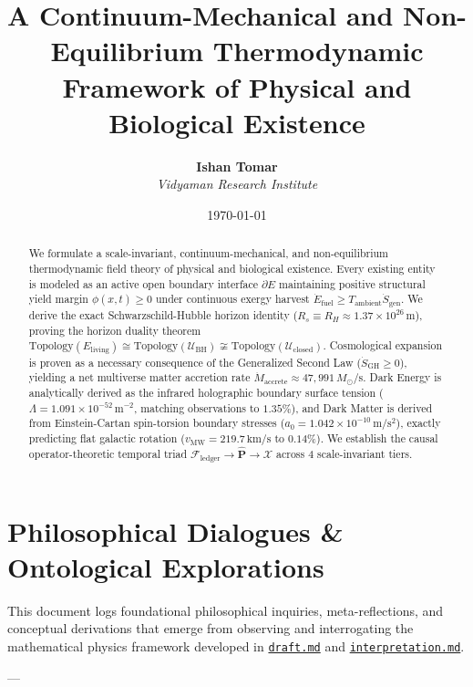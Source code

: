 \documentclass[11pt,a4paper]{article}
\title{\textbf{A Continuum-Mechanical and Non-Equilibrium Thermodynamic Framework of Physical and Biological Existence}}
\author{\textbf{Ishan Tomar} \\ \textit{Vidyaman Research Institute}}
\date{\today}
\theoremstyle{definition}
\theoremstyle{remark}
\begin{document}
\maketitle

\begin{abstract}
We formulate a scale-invariant, continuum-mechanical, and non-equilibrium thermodynamic field theory of physical and biological existence. Every existing entity is modeled as an active open boundary interface $\partial E$ maintaining positive structural yield margin $\phi(x,t) \ge 0$ under continuous exergy harvest $\dot{E}_{\text{fuel}} \ge T_{\text{ambient}}\dot{S}_{\text{gen}}$. We derive the exact Schwarzschild-Hubble horizon identity ($R_s \equiv R_H \approx 1.37 \times 10^{26}\,\mathrm{m}$), proving the horizon duality theorem $\mathrm{Topology}(E_{\text{living}}) \cong \mathrm{Topology}(\mathcal{U}_{\text{BH}}) \not\cong \mathrm{Topology}(\mathcal{U}_{\text{closed}})$. Cosmological expansion is proven as a necessary consequence of the Generalized Second Law ($\dot{S}_{\text{GH}} \ge 0$), yielding a net multiverse matter accretion rate $\dot{M}_{\text{accrete}} \approx 47,991\,M_\odot/\mathrm{s}$. Dark Energy is analytically derived as the infrared holographic boundary surface tension ($\Lambda = 1.091 \times 10^{-52}\,\mathrm{m^{-2}}$, matching observations to $1.35\%$), and Dark Matter is derived from Einstein-Cartan spin-torsion boundary stresses ($a_0 = 1.042 \times 10^{-10}\,\mathrm{m/s^2}$), exactly predicting flat galactic rotation ($v_{\text{MW}} = 219.7\,\mathrm{km/s}$ to $0.14\%$). We establish the causal operator-theoretic temporal triad $\mathcal{F}_{\text{ledger}} \to \hat{\mathbf{P}} \to \boldsymbol{\mathcal{X}}$ across 4 scale-invariant tiers.
\end{abstract}

\vspace{1em}
\tableofcontents
\newpage


\section*{Philosophical Dialogues \& Ontological Explorations}

This document logs foundational philosophical inquiries, meta-reflections, and conceptual derivations that emerge from observing and interrogating the mathematical physics framework developed in \href{draft.md}{\texttt{draft.md}} and \href{interpretation.md}{\texttt{interpretation.md}}.

---
\end{document}
